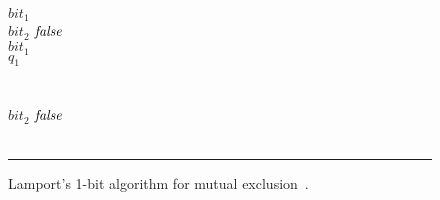 \begin{figure}[t]
\begin{minipage}[t]{.44\columnwidth}
    \tabTT \algIf $bit_1$ \algThen \\
    \tabTTT $bit_2$ \algAssgn $\operatorname{\mathit{false}}$ \\
    \tabTTT \algWhile $bit_1$ \algDo \algSkip \algOd \\
    \tabTTT \algGoto $q_1$ \\
    \tabTT \algFi \\
    \tabTT {} \\
    \tabTT $bit_2$ \algAssgn $\operatorname{\mathit{false}}$ \\
    \tabT \algOd \\
    \algEnd
  \end{minipage}
  \vspace{1.5ex}
  \hrule
\caption{Lamport's 1-bit algorithm for mutual exclusion~\cite{Lamport86}.}
\label{fig:lamport_src}
\end{figure}
